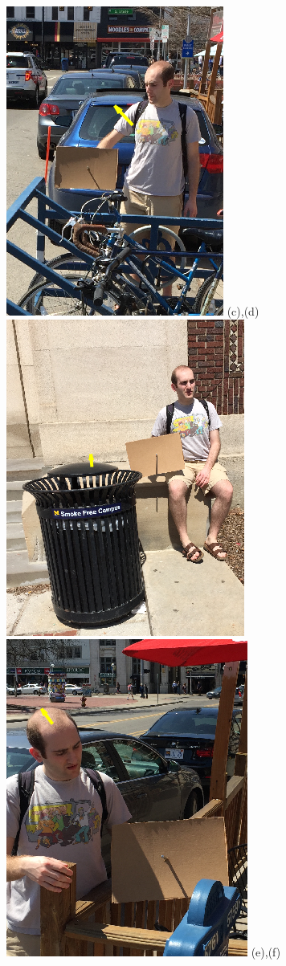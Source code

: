 \documentclass[10pt,twocolumn,letterpaper]{article}
\begin{document}
\begin{figure}[h]
\includegraphics[scale = 0.374]{bike_rack_1.png}
(c),(d)\\
\includegraphics[scale = 0.35]{garbage_can.png}
\includegraphics[scale = 0.35]{nathan_2.png}
(e),(f)
\end{figure}
\end{document}
